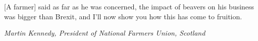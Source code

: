 \epigraph{[A farmer] said as far as he was concerned, the impact of beavers on his business was bigger than Brexit, and I’ll now show you how this has come to fruition.}{\textit{Martin Kennedy, President of National Farmers Union, Scotland} \parencite{kennedy_nfu_2023}}